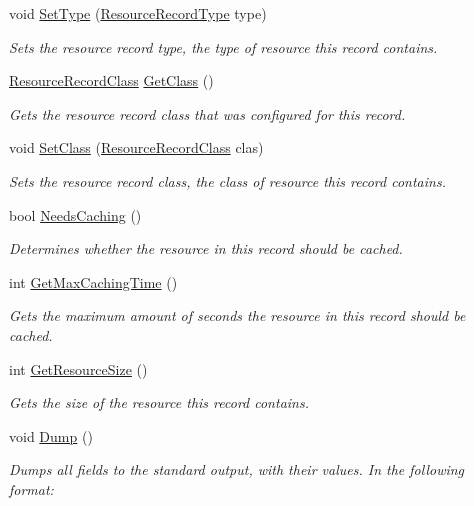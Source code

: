 \begin{DoxyCompactItemize}
void \hyperlink{class_senergy_1_1_dns_1_1_resource_record_ac339b08bf936f1971de6b24b46dd5813}{Set\-Type} (\hyperlink{namespace_senergy_1_1_dns_a590bfd748c955364770f5ce358d9dfe0}{Resource\-Record\-Type} type)
\begin{DoxyCompactList}\small\item\em Sets the resource record type, the type of resource this record contains. \end{DoxyCompactList}\item 
\hyperlink{namespace_senergy_1_1_dns_a953f153bc411213d621d00c1e1b3eb9d}{Resource\-Record\-Class} \hyperlink{class_senergy_1_1_dns_1_1_resource_record_a5b26da86b8ba4d6c0899dc56a9fee7c1}{Get\-Class} ()
\begin{DoxyCompactList}\small\item\em Gets the resource record class that was configured for this record. \end{DoxyCompactList}\item 
void \hyperlink{class_senergy_1_1_dns_1_1_resource_record_a4fca01c4e494f21c574e5c2bc382f3a3}{Set\-Class} (\hyperlink{namespace_senergy_1_1_dns_a953f153bc411213d621d00c1e1b3eb9d}{Resource\-Record\-Class} clas)
\begin{DoxyCompactList}\small\item\em Sets the resource record class, the class of resource this record contains. \end{DoxyCompactList}\item 
bool \hyperlink{class_senergy_1_1_dns_1_1_resource_record_ab90850f8b050337867261a55a2e43284}{Needs\-Caching} ()
\begin{DoxyCompactList}\small\item\em Determines whether the resource in this record should be cached. \end{DoxyCompactList}\item 
int \hyperlink{class_senergy_1_1_dns_1_1_resource_record_ab391deab6827e4e772809a3d025abb31}{Get\-Max\-Caching\-Time} ()
\begin{DoxyCompactList}\small\item\em Gets the maximum amount of seconds the resource in this record should be cached. \end{DoxyCompactList}\item 
int \hyperlink{class_senergy_1_1_dns_1_1_resource_record_affea007cc6d81a8a2dd80148c3386c62}{Get\-Resource\-Size} ()
\begin{DoxyCompactList}\small\item\em Gets the size of the resource this record contains. \end{DoxyCompactList}\item 
void \hyperlink{class_senergy_1_1_dns_1_1_resource_record_ac7dbce6e35f6141e09a7527c43d1de88}{Dump} ()
\begin{DoxyCompactList}\small\item\em Dumps all fields to the standard output, with their values. In the following format\-: \end{DoxyCompactList}\end{DoxyCompactItemize}
